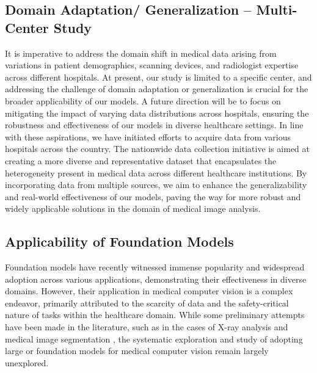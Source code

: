\subsection{Domain Adaptation/ Generalization – Multi-Center Study}
%
It is imperative to address the domain shift in medical data arising from variations in patient demographics, scanning devices, and radiologist expertise across different hospitals. At present, our study is limited to a specific center, and addressing the challenge of domain adaptation or generalization is crucial for the broader applicability of our models. A future direction will be to focus on mitigating the impact of varying data distributions across hospitals, ensuring the robustness and effectiveness of our models in diverse healthcare settings. 
In line with these aspirations, we have initiated efforts to acquire data from various hospitals across the country. The nationwide data collection initiative is aimed at creating a more diverse and representative dataset that encapsulates the heterogeneity present in medical data across different healthcare institutions. By incorporating data from multiple sources, we aim to enhance the generalizability and real-world effectiveness of our models, paving the way for more robust and widely applicable solutions in the domain of medical image analysis.

\subsection{Applicability of Foundation Models}
%
Foundation models have recently witnessed immense popularity and widespread adoption across various applications, demonstrating their effectiveness in diverse domains. However, their application in medical computer vision is a complex endeavor, primarily attributed to the scarcity of data and the safety-critical nature of tasks within the healthcare domain. While some preliminary attempts have been made in the literature, such as in the cases of X-ray analysis \cite{xraygpt} and medical image segmentation \cite{medsam}, the systematic exploration and study of adopting large or foundation models for medical computer vision remain largely unexplored.


